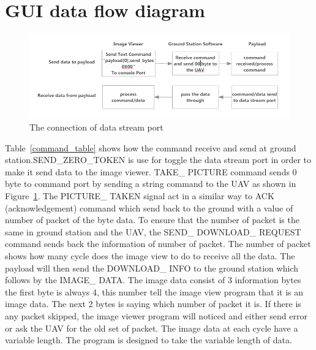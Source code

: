 \section{GUI data flow diagram}

\begin{figure}[H]
\begin{center}
\includegraphics[scale=0.6]{figures/GCS_Payload_communication.png} 
\caption{The connection of data stream port\label{GCS_Payload_comm}}
\end{center}
\end{figure}

Table~\ref{command_table} shows how the command receive and send at ground station.SEND\_ZERO\_TOKEN is use for toggle the data stream port in order to make it send data to the image viewer. TAKE\_ PICTURE command sends 0 byte to command port by sending a string command to the UAV as shown in Figure~\ref{GCS_Payload_comm}. The PICTURE\_ TAKEN signal act in a similar way to ACK (acknowledgement) command which send back to the ground with a value of number of packet of the byte data. To ensure that the number of packet is the same in ground station and the UAV, the SEND\_ DOWNLOAD\_ REQUEST command sends back the information of number of packet. The number of packet shows how many cycle does the image view to do to receive all the data.  The payload will then send the DOWNLOAD\_ INFO to the ground station which follows by the IMAGE\_ DATA. The image data consist of 3 information bytes the first byte is always 4, this number tell the image view program that it is an image data. The next 2 bytes is saying which number of packet it is. If there is any packet skipped, the image viewer program will noticed and either send error or ask the UAV for the old set of packet. The image data at each cycle have a variable length. The program is designed to take the variable length of data.


